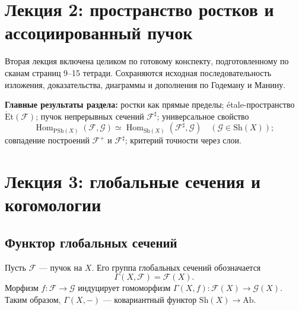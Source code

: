 \documentclass[11pt,b5paper,oneside]{article}
\newcommand{\F}{\mathscr F}
\newcommand{\G}{\mathscr G}
\newcommand{\Sh}{\mathrm{Sh}}
\newcommand{\PSh}{\mathrm{PSh}}
\newcommand{\Ab}{\mathrm{Ab}}
\newcommand{\et}{\mathrm{\acute Et}}
\newcommand{\Hom}{\operatorname{Hom}}
\theoremstyle{plain}
\theoremstyle{definition}
\theoremstyle{remark}
\begin{document}
\section{Лекция 2: пространство ростков и ассоциированный пучок}

Вторая лекция включена целиком по готовому конспекту, подготовленному по
сканам страниц 9--15 тетради. Сохраняются исходная последовательность
изложения, доказательства, диаграммы и дополнения по Годеману и Манину.
\par\medskip
\noindent\textbf{Главные результаты раздела:} ростки как прямые пределы;
étale-пространство $\et(\F)$; пучок непрерывных сечений
$\F^\sharp$; универсальное свойство
\[
  \Hom_{\PSh(X)}(\F,\G)\simeq
  \Hom_{\Sh(X)}(\F^\sharp,\G)
  \quad(\G\in\Sh(X));
\]
совпадение построений $\F^+$ и $\F^\sharp$; критерий точности через
слои.

\clearpage
{}
{}

\clearpage

\section{Лекция 3: глобальные сечения и когомологии}

\subsection{Функтор глобальных сечений}
Пусть $\F$ --- пучок на $X$. Его группа глобальных сечений обозначается
\[
  \Gamma(X,\F)=\F(X).
\]
Морфизм $f:\F\to\G$ индуцирует гомоморфизм
$\Gamma(X,f):\F(X)\to\G(X)$. Таким образом, $\Gamma(X,-)$ --- ковариантный
функтор $\Sh(X)\to\Ab$.
\end{document}
